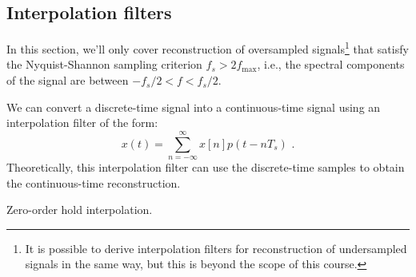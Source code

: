 \subsection{Interpolation filters}
In this section, we'll only cover reconstruction of oversampled signals\footnote{It is possible to derive interpolation filters for reconstruction of undersampled signals in the same way, but this is beyond the scope of this course.} that satisfy the Nyquist-Shannon sampling criterion $f_s > 2f_{\mathrm{max}}$, i.e., the spectral components of the signal are between $-f_s/2 < f < f_s/2$.

We can convert a discrete-time signal into a continuous-time signal using an interpolation filter of the form:
\begin{equation}
x(t) = \sum_{n=-\infty}^{\infty} x[n]p(t-nT_s)\,\,.
\end{equation}
Theoretically, this interpolation filter can use the discrete-time samples to obtain the continuous-time reconstruction. 
\begin{marginfigure}
\begin{center}
\end{center}
\caption{Zero-order hold interpolation.}
\label{fig:z-o-hold}
\end{marginfigure}

